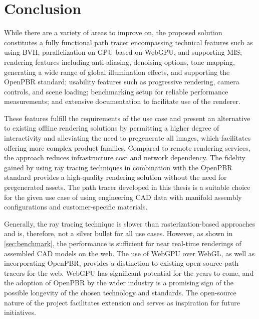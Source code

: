 \section{Conclusion}

While there are a variety of areas to improve on, the proposed solution constitutes a fully functional path tracer encompassing technical features such as using \gls{BVH}, parallelization on \gls{GPU} based on \gls{WebGPU}, and supporting \gls{MIS}; rendering features including anti-aliasing, denoising options, tone mapping, generating a wide range of global illumination effects, and supporting the \gls{OpenPBR} standard; usability features such as progressive rendering, camera controls, and scene loading; benchmarking setup for reliable performance measurements; and extensive documentation to facilitate use of the renderer.

These features fulfill the requirements of the use case and present an alternative to existing offline rendering solutions by permitting a higher degree of interactivity and alleviating the need to pregenerate all images, which facilitates offering more complex product families. Compared to remote rendering services, the approach reduces infrastructure cost and network dependency. The fidelity gained by using ray tracing techniques in combination with the \gls{OpenPBR} standard provides a high-quality rendering solution without the need for pregenerated assets. The path tracer developed in this thesis is a suitable choice for the given use case of using engineering \gls{CAD} data with manifold assembly configurations and customer-specific materials.

Generally, the ray tracing technique is slower than rasterization-based approaches and is, therefore, not a silver bullet for all use cases. However, as shown in \autoref{sec:benchmark}, the performance is sufficient for near real-time renderings of assembled \gls{CAD} models on the web. The use of \gls{WebGPU} over \gls{WebGL}, as well as incorporating \gls{OpenPBR}, provides a distinction to existing open-source path tracers for the web. \gls{WebGPU} has significant potential for the years to come, and the adoption of \gls{OpenPBR} by the wider industry is a promising sign of the possible longevity of the chosen technology and standards. The open-source nature of the project facilitates extension and serves as inspiration for future initiatives.

